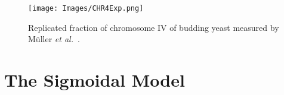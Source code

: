 		\begin{figure}[tbh]
			\begin{center}
				\texttt{[image: Images/CHR4Exp.png]}
			\end{center}
				\caption[Budding yeast chromosome IV replicated fraction]{\label{fig:ReplicatedFractionExample} Replicated fraction of chromosome IV of budding yeast measured by M{\"u}ller \emph{et al.}~\cite{DeepSeq}.
				}
		\end{figure}


	\section{The Sigmoidal Model}
	\label{sec:SigmoidalModel}
	
	